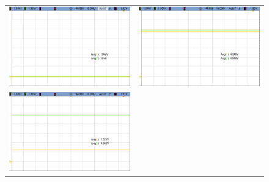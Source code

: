 \begin{figure}[H]
    \centering
    \begin{tabular}{c c}
        \includegraphics[scale=0.2]{../EJ5/Mediciones/Osciloscopio/CONEXION/cropped_entrada_estado_bajo.png} &
        \includegraphics[scale=0.2]{../EJ5/Mediciones/Osciloscopio/CONEXION/cropped_entrada_estado_alto.png} \\
        \includegraphics[scale=0.2]{../EJ5/Mediciones/Osciloscopio/CONEXION/cropped_entrada_al_aire.png} &

\end{tabular}
\end{figure}
